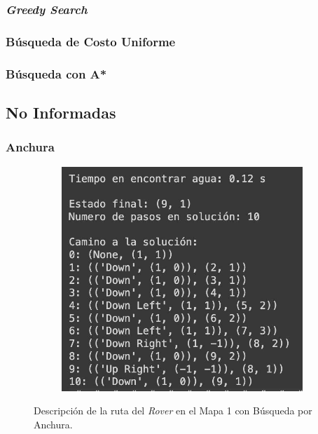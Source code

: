 \documentclass[12pt, letterpaper]{article}
\begin{document}
        \subsubsection{\textit{Greedy Search}}

        \subsubsection{Búsqueda de Costo Uniforme}

        \subsubsection{Búsqueda con A*}

    \subsection{No Informadas}

        \subsubsection{Anchura}

            \begin{figure}[h!]
                \centering
                \begin{subfigure}[h!]{0.45\textwidth}
                    \centering
                    \includegraphics[scale=0.25,angle=0]{anchuram1ruta.jpeg}
                \end{subfigure}
                \hfill
                \centering
                \caption{Descripción de la ruta del \textit{Rover} en el Mapa 1 con Búsqueda por Anchura.}\label{an_m1_d}
            \end{figure}
\end{document}
